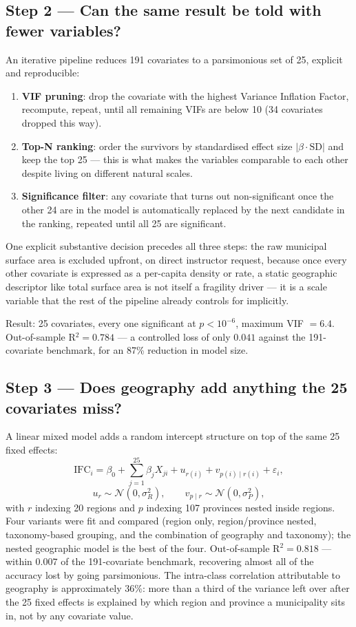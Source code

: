 \documentclass[11pt,a4paper]{article}
\begin{document}
\subsection*{Step 2 --- Can the same result be told with fewer
variables?}
An iterative pipeline reduces 191 covariates to a parsimonious set
of 25, explicit and reproducible:
\begin{enumerate}[leftmargin=2em]
  \item \textbf{VIF pruning}: drop the covariate with the highest
  Variance Inflation Factor, recompute, repeat, until all remaining
  VIFs are below 10 (34 covariates dropped this way).
  \item \textbf{Top-N ranking}: order the survivors by standardised
  effect size $|\beta \cdot \mathrm{SD}|$ and keep the top 25 ---
  this is what makes the variables comparable to each other despite
  living on different natural scales.
  \item \textbf{Significance filter}: any covariate that turns out
  non-significant once the other 24 are in the model is
  automatically replaced by the next candidate in the ranking,
  repeated until all 25 are significant.
\end{enumerate}
One explicit substantive decision precedes all three steps: the raw
municipal surface area is excluded upfront, on direct instructor
request, because once every other covariate is expressed as a
per-capita density or rate, a static geographic descriptor like
total surface area is not itself a fragility driver --- it is a
scale variable that the rest of the pipeline already controls for
implicitly.

Result: 25 covariates, every one significant at $p < 10^{-6}$,
maximum VIF $= 6.4$. Out-of-sample R$^2 = 0.784$ --- a controlled
loss of only $0.041$ against the 191-covariate benchmark, for an
87\% reduction in model size.

\subsection*{Step 3 --- Does geography add anything the 25 covariates
miss?}
A linear mixed model adds a random intercept structure on top of the
same 25 fixed effects:
$$
\text{IFC}_i = \beta_0 + \sum_{j=1}^{25}\beta_j X_{ji} +
u_{r(i)} + v_{p(i)\mid r(i)} + \varepsilon_i,
$$
$$
u_r \sim \mathcal{N}(0,\sigma_R^2), \qquad
v_{p\mid r} \sim \mathcal{N}(0,\sigma_P^2),
$$
with $r$ indexing 20 regions and $p$ indexing 107 provinces nested
inside regions. Four variants were fit and compared (region only,
region/province nested, taxonomy-based grouping, and the combination
of geography and taxonomy); the nested geographic model is the best
of the four. Out-of-sample R$^2 = 0.818$ --- within $0.007$ of the
191-covariate benchmark, recovering almost all of the accuracy lost
by going parsimonious. The intra-class correlation attributable to
geography is approximately 36\%: more than a third of the variance
left over after the 25 fixed effects is explained by which region
and province a municipality sits in, not by any covariate value.
\end{document}

